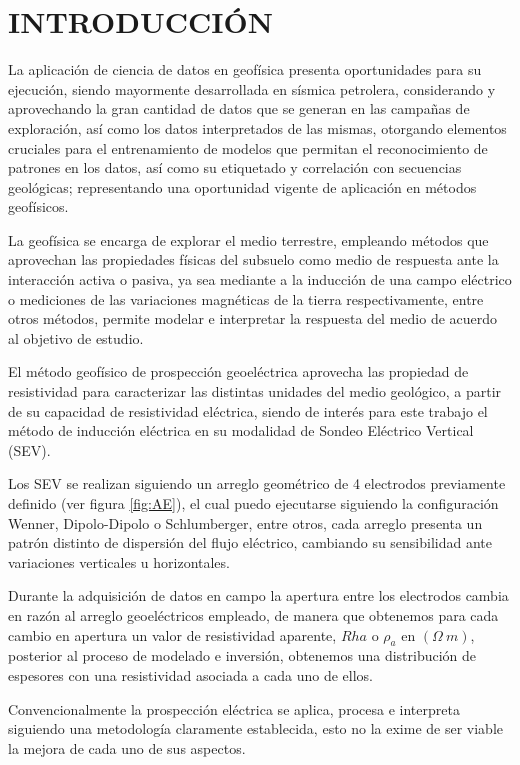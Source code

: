 \chapter{INTRODUCCIÓN}

La aplicación de ciencia de datos en geofísica presenta oportunidades para su ejecución, siendo mayormente desarrollada en sísmica petrolera, considerando y aprovechando la gran cantidad de datos que se generan en las campañas de exploración, así como los datos interpretados de las mismas, otorgando elementos cruciales para el entrenamiento de modelos que permitan el reconocimiento de patrones en los datos, así como su etiquetado y correlación con secuencias geológicas; representando una oportunidad vigente de aplicación en métodos geofísicos. 

La geofísica se encarga de explorar el medio terrestre, empleando métodos que aprovechan las propiedades físicas del subsuelo como medio de respuesta ante la interacción activa o pasiva, ya sea mediante a la inducción de una campo eléctrico o mediciones de las variaciones magnéticas de la tierra respectivamente, entre otros métodos, permite modelar e interpretar la respuesta del medio de acuerdo al objetivo de estudio.  

El método geofísico de prospección geoeléctrica aprovecha las propiedad de resistividad para caracterizar las distintas unidades del medio geológico, a partir de su capacidad de resistividad eléctrica, siendo de interés para este trabajo el método de inducción eléctrica en su modalidad de Sondeo Eléctrico Vertical (SEV).

Los SEV se realizan siguiendo un arreglo geométrico de 4 electrodos previamente definido (ver figura \ref{fig:AE}), el cual puedo ejecutarse siguiendo la configuración Wenner, Dipolo-Dipolo o Schlumberger, entre otros, cada arreglo presenta un patrón distinto de dispersión del flujo eléctrico, cambiando su sensibilidad ante variaciones verticales u horizontales. 

Durante la adquisición de datos en campo la apertura entre los electrodos cambia en razón al arreglo geoeléctricos empleado, de manera que obtenemos para cada cambio en apertura un valor de resistividad aparente, $Rha$ o $\rho_{a}$ en $(\varOmega\ m)$, posterior al proceso de modelado e inversión, obtenemos una distribución de espesores con una resistividad asociada a cada uno de ellos.

Convencionalmente la prospección eléctrica se aplica, procesa e interpreta siguiendo una metodología claramente establecida, esto no la exime de ser viable la mejora de cada uno de sus aspectos.

